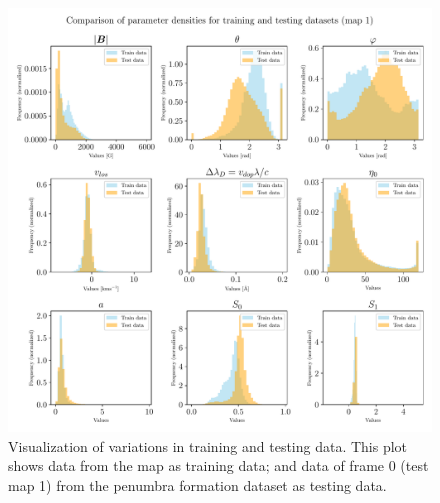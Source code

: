 \documentclass[a4paper,12pt]{report}
\def\lk#1{{\color{black}{#1}}}
\begin{document}
\begin{figure}[h!]
\centering
\includegraphics[width=\textwidth]{figures/nf-milne-eddington-example-4-nflows-piecewisequadratic-comp-paramdens-traintest-1.pdf}
\caption{Visualization of variations in training and testing data. This plot shows data from the \lk{sunspot} map as training data; and data of frame 0 (test map 1) from the penumbra formation dataset as testing data.}
\label{fig:nf-milne-eddington-example-4-nflows-piecewisequadratic-comp-paramdens-traintest-1}
\end{figure}
\end{document}
